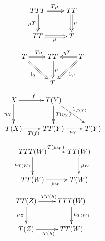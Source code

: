 \documentclass[12pt]{ujarticle}
\begin{document}
\[
\xymatrix{
  TTT \ar@{=>}[r]^{T\mu} \ar@{=>}[d]_{\mu T} & TT \ar@{=>}[d]^{\mu} \\
  TT \ar@{=>}[r]_{\mu} & T
}
\]
\[
\xymatrix{
  T \ar@{=>}[r]^{T\eta} \ar@{=>}[rd]_{1_T} & TT \ar@{=>}[d]^{\mu} & T \ar@{=>}[l]_{\eta T} \ar@{=>}[ld]^{1_T} \\
  & T &
}
\]
\[
\xymatrix{
  X \ar[r]^{f} \ar[d]_{\eta_X} & T(Y) \ar[d]^{T(\eta_Y)} \ar[rd]^{1_{T(Y)}} \\
  T(X) \ar[r]_{T(f)} & TT(Y) \ar[r]_{\mu_Y} & T(Y)
}
\]
\[
\xymatrix{
  TTT(W) \ar[r]^{T(\mu_W)} \ar[d]_{\mu_{T(W)}} & TT(W) \ar[d]^{\mu_W} \\
  TT(W) \ar[r]_{\mu_W} & T(W)
}
\]
\[
\xymatrix{
  TT(Z) \ar[r]^{TT(h)} \ar[d]_{\mu_Z} & TTT(W) \ar[d]^{\mu_{T(W)}} \\
  T(Z) \ar[r]_{T(h)} & TT(W)
}
\]
\end{document}
